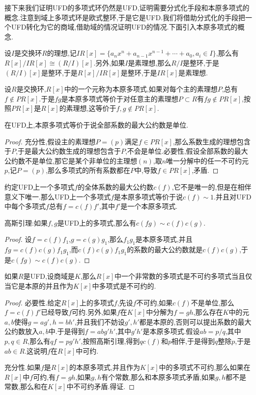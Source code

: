 接下来我们证明UFD的多项式环仍然是UFD,证明需要分式化手段和本原多项式的概念.注意到域上多项式环是欧式整环,于是它是UFD.我们将借助分式化的手段把一个UFD转化为它的商域,借助域的情况证明UFD的情况.下面引入本原多项式的概念.

设$I$是交换环$R$的理想,记$IR[x]=\{a_nx^n+a_ {n-1}x^{n-1}+\cdots+a_0,a_i\in I\}$,那么有$R[x]/IR[x]\cong (R/I)[x]$.另外,如果$I$是素理想,那么$R/I$是整环,于是$(R/I)[x]$是整环,于是$R[x]/IR[x]$是整环,于是$IR[x]$是素理想.

设$R$是交换环,$R[x]$中的一个元称为本原多项式,如果对每个主的素理想$P$,总有$f\not\in PR[x]$.于是$fg$是本原多项式等价于对任意主的素理想$P\subset R$有$fg\not\in PR[x]$,按照$PR[x]$是$R[x]$的素理想,这等价于$f,g\not\in PR[x]$.

在UFD上,本原多项式等价于说全部系数的最大公约数是单位.
\begin{proof}
	
	充分性,假设主的素理想$P=(p)$满足$f\in PR[x]$,那么系数生成的理想包含于$P$,于是最大公约数生成的理想包含于$P$,不会是单位.必要性,假设全部系数的最大公约数不是单位,那它是某个非单位的主理想$(n)$,取$n$唯一分解中的任一不可约元$p$,记$P=(p)$,那么多项式的所有系数都在$P$中,导致$f\in PR[x]$,矛盾.
\end{proof}

约定UFD上一个多项式$f$的全体系数的最大公约数$c(f)$,它不是唯一的,但是在相伴意义下唯一.那么UFD上一个多项式$f$是本原多项式等价于说$c(f)\sim1$.并且对UFD中每个多项式$f$总有$f=c(f)f'$,其中$f'$是一个本原多项式.

高斯引理:如果$f,g$是UFD上的多项式,那么有$c(fg)\sim c(f)c(g)$.
\begin{proof}
	
	设$f=c(f)f_1$,$g=c(g)g_1$,那么$f_1g_1$是本原多项式,并且$fg=c(f)c(g)f_1g_1$,而$c(f)c(g)f_1g_1$的系数的最大公约数就是$c(f)c(g)$,于是$c(fg)\sim c(f)c(g)$.
\end{proof}

如果$R$是UFD,设商域是$K$,那么$R[x]$中一个非常数的多项式是不可约多项式当且仅当它是本原的并且作为$K[x]$中多项式是不可约的.
\begin{proof}
	
	必要性.给定$R[x]$上的多项式$f$,先设$f$不可约,如果$c(f)$不是单位,那么$f=c(f)f'$已经导致$f$可约.另外,如果$f$在$K[x]$中分解为$f=gh$,那么存在$K$中的元$a,b$使得$g=ag',h=bh'$,并且我们不妨设$g',h'$都是本原的,否则可以提出系数的最大公约数放入$a,b$中.于是得到$f=abg'h'$,其中$g'h'$是本原多项式.假设$ab=p/q$,其中$p,q\in R$,那么有$qf=pg'h'$,按照高斯引理,得到$qc(f)$和$p$相伴,于是得到$q$整除$p$,于是$ab\in R$.这说明$f$在$R[x]$中可约.
	
	充分性.如果$f$是$R[x]$的本原多项式,并且作为$K[x]$中的多项式不可约,那么如果在$R[x]$中$f$可约,有$f=gh$,如果$g,h$有个常数,那么和本原多项式矛盾,如果$g,h$都不是常数,那么和在$K[x]$中不可约矛盾.得证.
\end{proof}

